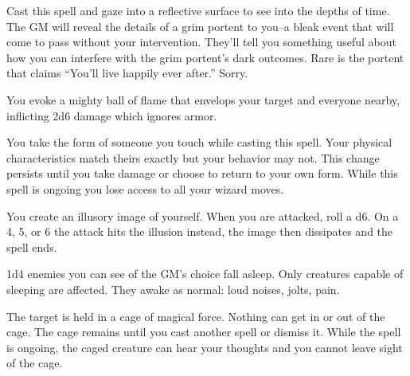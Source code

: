 
Cast this spell and gaze into a reflective surface to see into the depths of time. The GM will reveal the details of a grim portent to you--a bleak event that will come to pass without your intervention. They'll tell you something useful about how you can interfere with the grim portent's dark outcomes. Rare is the portent that claims ``You'll live happily ever after.'' Sorry.



You evoke a mighty ball of flame that envelops your target and everyone nearby, inflicting 2d6 damage which ignores armor.



You take the form of someone you touch while casting this spell. Your physical characteristics match theirs exactly but your behavior may not. This change persists until you take damage or choose to return to your own form. While this spell is ongoing you lose access to all your wizard moves.



You create an illusory image of yourself. When you are attacked, roll a d6. On a 4, 5, or 6 the attack hits the illusion instead, the image then dissipates and the spell ends.



1d4 enemies you can see of the GM's choice fall asleep. Only creatures capable of sleeping are affected. They awake as normal: loud noises, jolts, pain.



The target is held in a cage of magical force. Nothing can get in or out of the cage. The cage remains until you cast another spell or dismiss it. While the spell is ongoing, the caged creature can hear your thoughts and you cannot leave sight of the cage.


